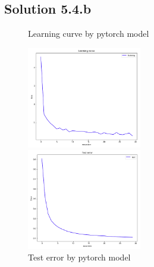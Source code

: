 \documentclass[a4paper]{article}
\theoremstyle{definition}
\newenvironment{soln}{
	\leavevmode\color{blue}\ignorespaces
}{}
\begin{document}
	\subsection*{Solution 5.4.b}
	\begin{soln}
\begin{figure}[htbp]
\begin{minipage}{0.5\hsize}
\begin{center}
\caption{Learning curve by pytorch model}
\includegraphics[width=50mm]{./img/my_lc_b.png}
\end{center}
\captionsetup{labelformat=empty}
\end{minipage}
\begin{minipage}{0.5\hsize}
\begin{center}
\caption{Test error by pytorch model}
\includegraphics[width=50mm]{./img/my_er_b.png}
\end{center}
\captionsetup{labelformat=empty}
\end{minipage}
\end{figure}

	\end{soln}

		

	
		
	
	
	
	
	
	
	
	
	
	
\end{document}
